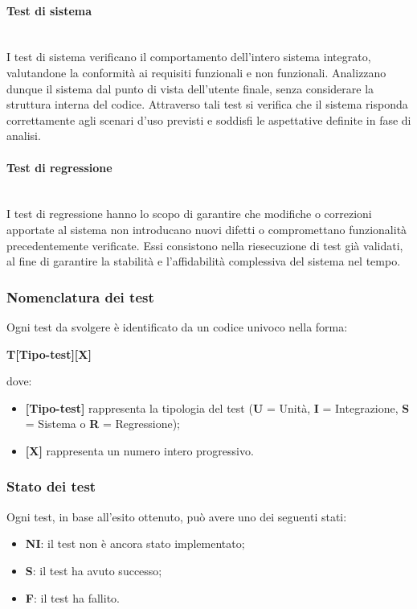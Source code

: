 \documentclass[10pt, letterpaper]{article}
\newcommand{\trisubsection}[1]{\paragraph{#1}\mbox{}\\}
\begin{document}
\trisubsection{Test di sistema}
I test di sistema verificano il comportamento dell'intero sistema integrato,
valutandone la conformità ai requisiti funzionali e non funzionali.
Analizzano dunque il sistema dal punto di vista dell'utente finale,
senza considerare la struttura interna del codice.
Attraverso tali test si verifica che il sistema risponda correttamente agli
scenari d'uso previsti e soddisfi le aspettative definite in fase di analisi.

\trisubsection{Test di regressione}
I test di regressione hanno lo scopo di garantire che modifiche o correzioni
apportate al sistema non introducano nuovi difetti o compromettano
funzionalità precedentemente verificate.
Essi consistono nella riesecuzione di test già validati, al fine di garantire
la stabilità e l'affidabilità complessiva del sistema nel tempo.

\subsubsection{Nomenclatura dei test}
Ogni test da svolgere è identificato da un codice univoco nella forma:
\begin{center}
    \textbf{T[Tipo-test][X]}
\end{center}
dove:
\begin{itemize}
    \item \textbf{[Tipo-test]} rappresenta la tipologia del test (\textbf{U} = Unità,
          \textbf{I} = Integrazione, \textbf{S} = Sistema o \textbf{R} = Regressione);
    \item \textbf{[X]} rappresenta un numero intero progressivo.
\end{itemize}

\subsubsection{Stato dei test}
Ogni test, in base all'esito ottenuto, può avere uno dei seguenti stati:
\begin{itemize}
    \item \textbf{NI}: il test non è ancora stato implementato;
    \item \textbf{S}: il test ha avuto successo;
    \item \textbf{F}: il test ha fallito.
\end{itemize}
\end{document}

